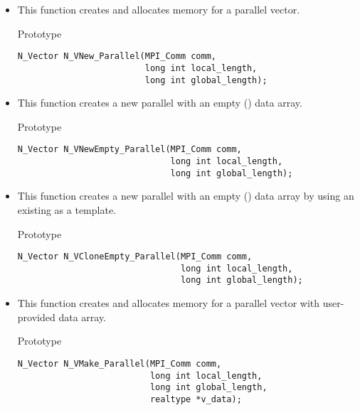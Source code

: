 \begin{itemize}


\item  {}
  
  This function creates and allocates memory for a parallel vector.
 
  Prototype

\begin{verbatim}
N_Vector N_VNew_Parallel(MPI_Comm comm, 
                         long int local_length, 
                         long int global_length);
\end{verbatim}
  

\item {}
 
  This function creates a new parallel  with an empty () data array.
 
  Prototype

\begin{verbatim}
N_Vector N_VNewEmpty_Parallel(MPI_Comm comm, 
                              long int local_length, 
                              long int global_length);
\end{verbatim}

  

\item {}
 
  This function creates a new parallel  with an empty () data array
  by using an existing  as a template.
 
  Prototype

\begin{verbatim}
N_Vector N_VCloneEmpty_Parallel(MPI_Comm comm, 
                                long int local_length, 
                                long int global_length);
\end{verbatim}

  

\item {}
  
  This function creates and allocates memory for a parallel vector
  with user-provided data array.
 
  Prototype

\begin{verbatim}
N_Vector N_VMake_Parallel(MPI_Comm comm, 
                          long int local_length,
                          long int global_length,
                          realtype *v_data);
\end{verbatim}


\end{itemize}
